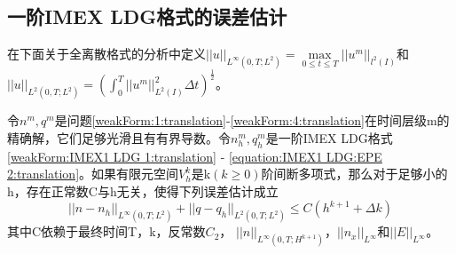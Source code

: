 \subsection{一阶IMEX LDG格式的误差估计}
在下面关于全离散格式的分析中定义$||u||_{L^{\infty}(0,T;L^2)}  = \max \limits_{0 \leq t \leq T}||u^m||_{l^2(I)}$和$||u||_{L^2(0,T;L^2)} = (\int_{0}^{T}||u^m||_{L^2(I)}^2\Delta t)^{\frac{1}{2}}$。
\begin{theorem}
    令$n^m,q^m$是问题\eqref{weakForm:1:translation}-\eqref{weakForm:4:translation}在时间层级m的精确解，它们足够光滑且有有界导数。令$n_h^m,q_h^m$是一阶IMEX LDG格式\eqref{weakForm:IMEX1 LDG 1:translation} - \eqref{equation:IMEX1 LDG:EPE 2:translation}。如果有限元空间$V_h^k$是k$(k\geq  0)$阶间断多项式，那么对于足够小的h，存在正常数C与h无关，使得下列误差估计成立
    \begin{equation}
        ||n-n_h||_{L^{\infty}(0,T;L^2)} + ||q - q_h||_{L^2(0,T;L^2)} \leq C(h^{k+1} + \Delta k)
    \end{equation}
    其中C依赖于最终时间T，k，反常数$C_2$， $||n||_{L^{\infty}(0,T;H^{k+1})}$，$||n_x||_{L^{\infty}}$和$||E||_{L^{\infty}}$。
\end{theorem}
